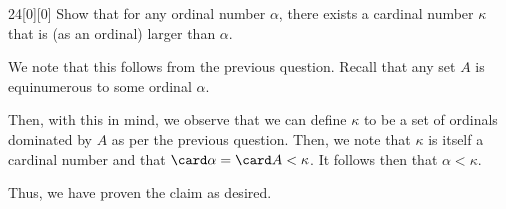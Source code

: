 \documentclass{article}
\begin{document}
\begin{hw}{24}[0][0]
	Show that for any ordinal number $\alpha$, there exists a cardinal number $\kappa$ that is (as an ordinal) larger than $\alpha$.
\end{hw}
\begin{solution}
	We note that this follows from the previous question. Recall that any set $A$ is equinumerous to some ordinal $\alpha$.
	
	Then, with this in mind, we observe that we can define $\kappa$ to be a set of ordinals dominated by $A$ as per the previous question. Then, we note that $\kappa$ is itself a cardinal number and that $\card \alpha = \card A < \kappa$. It follows then that $\alpha < \kappa$.
	
	Thus, we have proven the claim as desired.
\end{solution}
\end{document}
